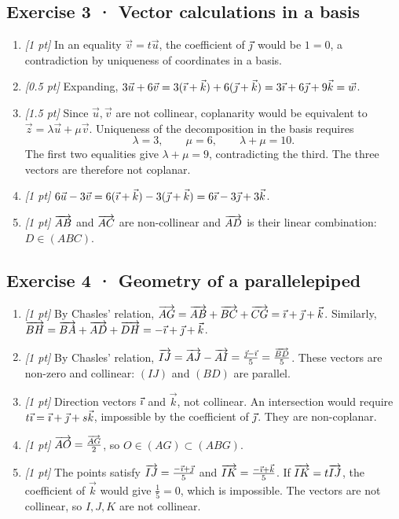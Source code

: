 \subsection*{Exercise 3 · Vector calculations in a basis}\begin{enumerate}

\item \textit{[1 pt]} In an equality $\vec v=t\vec u$, the coefficient of $\vec{\jmath} $ would be $1=0$, a contradiction by uniqueness of coordinates in a basis.

\item \textit{[0.5 pt]} Expanding, $3\vec u+6\vec v=3(\vec{\imath} +\vec k)+6(\vec{\jmath} +\vec k)=3\vec{\imath} +6\vec{\jmath} +9\vec k=\vec w$.

\item \textit{[1.5 pt]} Since $\vec u,\vec v$ are not collinear, coplanarity would be equivalent to $\vec z=\lambda\vec u+\mu\vec v$. Uniqueness of the decomposition in the basis requires
\[\lambda=3,\qquad\mu=6,\qquad\lambda+\mu=10.\]
The first two equalities give $\lambda+\mu=9$, contradicting the third. The three vectors are therefore not coplanar.

\item \textit{[1 pt]} $6\vec u-3\vec v=6(\vec{\imath} +\vec k)-3(\vec{\jmath} +\vec k)=6\vec{\imath} -3\vec{\jmath} +3\vec k$.

\item \textit{[1 pt]} $\overrightarrow{AB}$ and $\overrightarrow{AC}$ are non-collinear and $\overrightarrow{AD}$ is their linear combination: $D\in(ABC)$.

\end{enumerate}

\subsection*{Exercise 4 · Geometry of a parallelepiped}\begin{enumerate}

\item \textit{[1 pt]} By Chasles' relation, $\overrightarrow{AG}=\overrightarrow{AB}+\overrightarrow{BC}+\overrightarrow{CG}=\vec{\imath} +\vec{\jmath} +\vec k$. Similarly, $\overrightarrow{BH}=\overrightarrow{BA}+\overrightarrow{AD}+\overrightarrow{DH}=-\vec{\imath} +\vec{\jmath} +\vec k$.

\item \textit{[1 pt]} By Chasles' relation, $\overrightarrow{IJ}=\overrightarrow{AJ}-\overrightarrow{AI}=\frac{\vec{\jmath} -\vec{\imath} }{5}=\frac{\overrightarrow{BD}}{5}$. These vectors are non-zero and collinear: $(IJ)$ and $(BD)$ are parallel.

\item \textit{[1 pt]} Direction vectors $\vec{\imath} $ and $\vec k$, not collinear. An intersection would require $t\vec{\imath} =\vec{\imath} +\vec{\jmath} +s\vec k$, impossible by the coefficient of $\vec{\jmath} $. They are non-coplanar.

\item \textit{[1 pt]} $\overrightarrow{AO}=\frac{\overrightarrow{AG}}{2}$, so $O\in(AG)\subset(ABG)$.

\item \textit{[1 pt]} The points satisfy $\overrightarrow{IJ}=\frac{-\vec{\imath} +\vec{\jmath} }{5}$ and $\overrightarrow{IK}=\frac{-\vec{\imath} +\vec k}{5}$. If $\overrightarrow{IK}=t\overrightarrow{IJ}$, the coefficient of $\vec k$ would give $\frac{1}{5}=0$, which is impossible. The vectors are not collinear, so $I,J,K$ are not collinear.

\end{enumerate}

\fi

\fi

